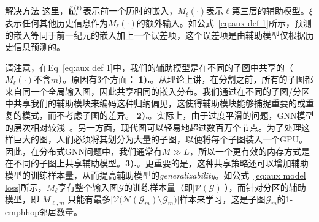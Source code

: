 \begin{section}{解决方法}
    这里，$\mathbf{\Tilde{h}}^{(\ell)}_u$表示前一个历时的嵌入，$M_{\ell}(\cdot)$表示$\ell$第三层的辅助模型。$\xi$表示任何其他历史信息作为$M_{\ell}(\cdot)$的额外输入。如公式~\ref{eq:aux def 1}所示，预测的嵌入等同于前一纪元的嵌入加上一个误差项，这个误差项是由辅助模型仅根据历史信息预测的。

    请注意，在Eq~\ref{eq:aux def 1}中，我们的辅助模型是在不同的子图中共享的（$M_{\ell}(\cdot)$不含$m$）。原因有3个方面： \textbf{1).}。从理论上讲，在分割之前，所有的子图都来自同一个全局输入图，因此共享相同的嵌入分布。我们通过在不同的子图/分区中共享我们的辅助模块来编码这种归纳偏见，这使得辅助模块能够捕捉重要的或重复的模式，而不考虑子图的差异。 \textbf{2).}。实际上，由于过度平滑的问题，GNN模型的层次相对较浅~\cite{chen2020measuring}。另一方面，现代图可以轻易地超过数百万个节点。为了处理这样巨大的图，人们必须将其划分为大量的子图，以便将每个子图装入一个GPU。因此，在分布式GNN问题中，我们通常有$M\gg L$，所以一个更有效的内存方式是在不同的子图上共享辅助模型。\textbf{3).}。更重要的是，这种共享策略还可以增加辅助模型的训练样本量，从而提高辅助模型的\emph{generalizability}。如公式~\ref{eq:aux model loss}所示，$M_{\ell}$享有整个输入图$\mathcal{G}$的训练样本量（即$\vert\mathcal{V}(\mathcal{G})\vert$），而针对分区的辅助模型，即 $M_{\ell,m}$ 只能有最多$\big\vert\mathcal{V}\big(\mathcal{N}(\mathcal{G}_{m}) \setminus \mathcal{G}_{m}\big)\big\vert$样本来学习，这是子图$\mathcal{G}_m$的1-emph{hop}邻居数量。


\end{section}